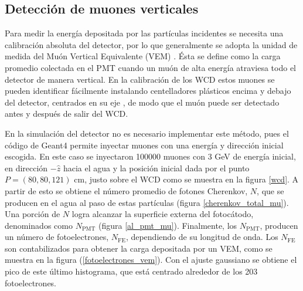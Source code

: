 \documentclass[12pt,oneside,openany,letter]{book}
\begin{document}
\subsection{Detección de muones verticales}
Para medir la energía depositada por las partículas incidentes se necesita una calibración absoluta del detector, por lo que generalmente se adopta la unidad de medida del Muón Vertical Equivalente (VEM) \cite{AEtchegoyen-etal2005}. \'Esta se define como la carga promedio colectada en el PMT cuando un muón de alta energía atraviesa todo el detector de manera vertical. En la calibración de los WCD estos muones se pueden identificar fácilmente instalando centelladores plásticos encima y debajo del detector, centrados en su eje \cite{AEtchegoyen-etal2005}, de modo que el muón puede ser detectado antes y después de salir del WCD.

En la simulación del detector no es necesario implementar este método, pues el código de Geant4 permite inyectar muones con una energía y dirección inicial escogida. En este caso se inyectaron 100000 muones con 3 GeV de energía inicial, en dirección $-\hat{z}$ hacia el agua y la posición inicial dada por el punto $P = (80, 80, 121)$ cm, justo sobre el WCD como se muestra en la figura \ref{wcd}. A partir de esto se obtiene el número promedio de fotones Cherenkov, $N$, que se producen en el agua al paso de estas partículas (figura \ref{cherenkov_total_mu}). Una porción de $N$ logra alcanzar la superficie externa del fotoc\'atodo, denominados como $N_{\mathrm{PMT}}$ (figura \ref{al_pmt_mu}). Finalmente, los $N_{\mathrm{PMT}}$, producen un n\'umero de fotoelectrones, $N_{\mathrm{FE}}$, dependiendo de su longitud de onda. Los $N_{\mathrm{FE}}$ son contabilizados para obtener la carga depositada por un VEM, como se muestra en la figura (\ref{fotoelectrones_vem}). Con el ajuste gaussiano se obtiene el pico de este \'ultimo histograma, que está centrado alrededor de los 203 fotoelectrones.
\end{document}
